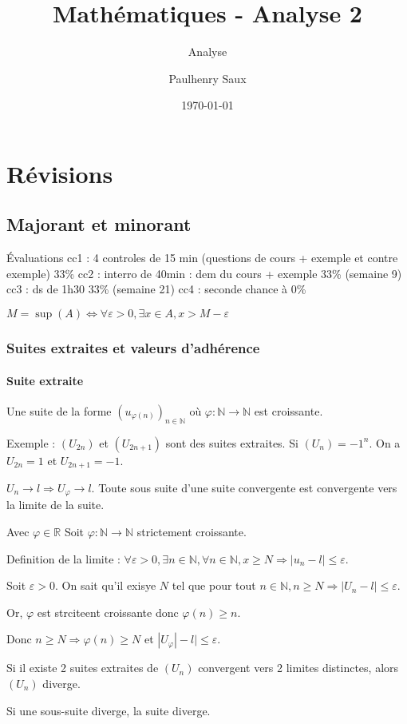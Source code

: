 \documentclass[french]{yLectureNote}
\title{Mathématiques - Analyse 2}
\subtitle{Analyse}
\author{Paulhenry Saux}
\date{\today}
\begin{document}
	\chapter{Révisions }
\section{Majorant et minorant}
Évaluations
cc1 : 4 controles de 15 min (questions de cours + exemple et contre exemple) 33\%
cc2 : interro de 40min : dem du cours + exemple 33\% (semaine 9)
cc3 : ds de 1h30 33\% (semaine 21)
cc4 : seconde chance à 0\%

$M = \sup(A) \iff \forall \varepsilon >0, \exists x\in A, x>M-\varepsilon$
\subsection{Suites extraites et valeurs d'adhérence}
\subsubsection{Suite extraite}
Une suite de la forme $(u_{\varphi(n)})_{n\in\mathbb{N}}$ où $\varphi : \mathbb{N} \to \mathbb{N}$ est croissante.

Exemple : $(U_{2n})$ et $(U_{2n+1})$ sont des suites extraites. Si $(U_n) = -1^n$. On a $U_{2n} = 1$ et $U_{2n+1} = -1$.

\begin{theorem}
 $U_n \to l \Rightarrow U_{\varphi} \to l$. Toute sous suite d'une suite convergente est convergente vers la limite de la suite.
\end{theorem}
\begin{myproof}
Avec $\varphi \in \mathbb{R}$ Soit $\varphi : \mathbb{N} \to \mathbb{N}$ strictement croissante.

Definition de la limite : $\forall \varepsilon >0,\exists n \in \mathbb{N}, \forall n\in\mathbb{N}, x\geq N \Rightarrow |u_n-l| \leq \varepsilon$.

Soit $\varepsilon >0$. On sait qu'il exisye $N$ tel que pour tout $n\in\mathbb{N}, n\geq N \Rightarrow |U_n -l|\leq \varepsilon$.

Or, $\varphi$ est strciteent croissante donc $\varphi(n) \geq n$.

Donc $n\geq N \Rightarrow \varphi(n) \geq N$ et $|U_{\varphi}| - l| \leq \varepsilon$.
\end{myproof}
\begin{theorem}[Corrolaire 1]
 Si il existe 2 suites extraites de $(U_n)$ convergent vers 2 limites distinctes, alors $(U_n)$ diverge.
\end{theorem}
\begin{theorem}
 Si une sous-suite diverge, la suite diverge.
\end{theorem}
\end{document}
